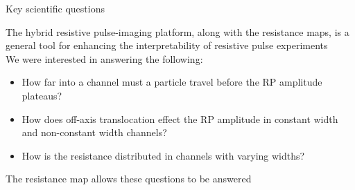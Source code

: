 \begin{frame}[c]{Key scientific questions}
	
	The hybrid resistive pulse-imaging platform, along with the resistance maps, is a general tool for enhancing the interpretability of resistive pulse experiments \\
	\vspace{.1in}
	We were interested in answering the following: \\
	
	\begin{itemize}
		\item How far into a channel must a particle travel before the RP amplitude plateaus?
		\item How does off-axis translocation effect the RP amplitude in constant width and non-constant width channels?
		\item How is the resistance distributed in channels with varying widths?
	\end{itemize}
	
	The resistance map allows these questions to be answered

	
\end{frame}





